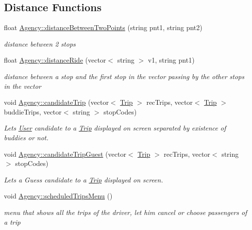 \subsection*{Distance Functions}
\begin{DoxyCompactItemize}
\item 
float \hyperlink{group___agency_ga4efd6041c1293f0366b76356c05e3520}{Agency\+::distance\+Between\+Two\+Points} (string pnt1, string pnt2)
\begin{DoxyCompactList}\small\item\em distance between 2 stops \end{DoxyCompactList}\item 
float \hyperlink{group___agency_ga4a3c0e75130deeba5f9fe8dc4cec0468}{Agency\+::distance\+Ride} (vector$<$ string $>$ v1, string pnt1)
\begin{DoxyCompactList}\small\item\em distance between a stop and the first stop in the vector passing by the other stops in the vector \end{DoxyCompactList}\item 
void \hyperlink{group___agency_ga51d72590b842d0df300cd39846353f00}{Agency\+::candidate\+Trip} (vector$<$ \hyperlink{class_trip}{Trip} $>$ rec\+Trips, vector$<$ \hyperlink{class_trip}{Trip} $>$ buddie\+Trips, vector$<$ string $>$ stop\+Codes)
\begin{DoxyCompactList}\small\item\em Lets \hyperlink{class_user}{User} candidate to a \hyperlink{class_trip}{Trip} displayed on screen separated by existence of buddies or not. \end{DoxyCompactList}\item 
void \hyperlink{group___agency_ga55ae3f0e58a987ab17bd7dd358add125}{Agency\+::candidate\+Trip\+Guest} (vector$<$ \hyperlink{class_trip}{Trip} $>$ rec\+Trips, vector$<$ string $>$ stop\+Codes)
\begin{DoxyCompactList}\small\item\em Lets a Guess candidate to a \hyperlink{class_trip}{Trip} displayed on screen. \end{DoxyCompactList}\item 
\mbox{\label{group___agency_ga83b9652dad153b729c19f3413620908a}} 
void \hyperlink{group___agency_ga83b9652dad153b729c19f3413620908a}{Agency\+::scheduled\+Trips\+Menu} ()
\begin{DoxyCompactList}\small\item\em menu that shows all the trips of the driver, let him cancel or choose passengers of a trip \end{DoxyCompactList}\end{DoxyCompactItemize}


